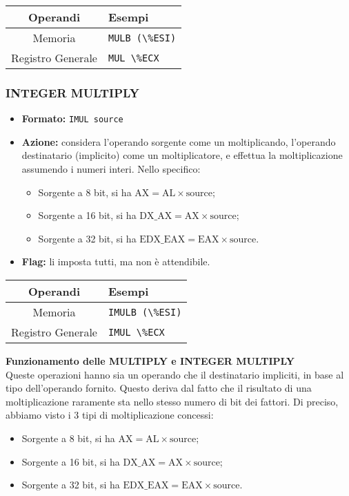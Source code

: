 \documentclass[a4paper,11pt]{article}
\begin{document}
		\begin{table}[H]
		\center {}
			\begin{tabular} { c | p{5cm} }
				\bfseries Operandi & \bfseries Esempi \\
				\hline
				Memoria & \lstinline|MULB (\%ESI)| \\ 
				Registro Generale & \lstinline|MUL \%ECX|
			\end{tabular}
		\end{table}

\subsubsection{INTEGER MULTIPLY}
\begin{itemize}
	\item \textbf{Formato:} \lstinline|IMUL source|
	\item \textbf{Azione:} considera l'operando sorgente come un moltiplicando, l'operando destinatario (implicito) come un moltiplicatore, e effettua la moltiplicazione assumendo i numeri interi. Nello specifico:
	\begin{itemize}
		\item Sorgente a 8 bit, si ha $\text{AX} = \text{AL} \times \text{source}$;
		\item Sorgente a 16 bit, si ha $\text{DX}\_\text{AX} = \text{AX} \times \text{source}$;
		\item Sorgente a 32 bit, si ha $\text{EDX}\_\text{EAX} = \text{EAX} \times \text{source}$.
	\end{itemize}
	\item \textbf{Flag:} li imposta tutti, ma non è attendibile.
\end{itemize}

		\begin{table}[H]
		\center {}
			\begin{tabular} { c | p{5cm} }
				\bfseries Operandi & \bfseries Esempi \\
				\hline
				Memoria & \lstinline|IMULB (\%ESI)| \\ 
				Registro Generale & \lstinline|IMUL \%ECX|
			\end{tabular}
		\end{table}

\par\medskip
\noindent
\textbf{\textsf{Funzionamento delle MULTIPLY e INTEGER MULTIPLY}} \\
Queste operazioni hanno sia un operando che il destinatario impliciti, in base al tipo dell'operando fornito.
Questo deriva dal fatto che il risultato di una moltiplicazione raramente sta nello stesso numero di bit dei fattori.
Di preciso, abbiamo visto i 3 tipi di moltiplicazione concessi:
\begin{itemize}
	\item Sorgente a 8 bit, si ha $\text{AX} = \text{AL} \times \text{source}$;
	\item Sorgente a 16 bit, si ha $\text{DX}\_\text{AX} = \text{AX} \times \text{source}$;
	\item Sorgente a 32 bit, si ha $\text{EDX}\_\text{EAX} = \text{EAX} \times \text{source}$.
\end{itemize}
\end{document}
